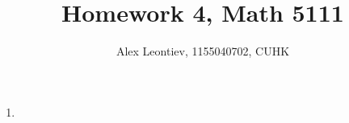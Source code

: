 \documentclass[8pt]{article} %
\title{Homework 4, Math 5111}
\author{Alex Leontiev, 1155040702, CUHK}
\begin{document}
\maketitle
\begin{enumerate}[label=\bfseries Problem \arabic*.]
	\item 
\end{enumerate}
\end{document}
